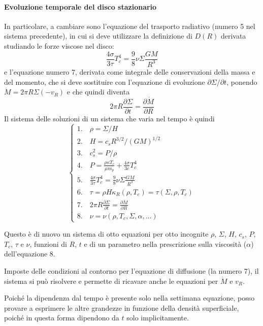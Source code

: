 \documentclass[a4paperbi]{article}
\begin{document}
	\paragraph{Evoluzione temporale del disco stazionario}
	In particolare, a cambiare sono l'equazione del trasporto radiativo (numero 5 nel sistema precedente), in cui si deve utilizzare la definizione di $D(R)$ derivata studiando le forze viscose nel disco:
	\begin{equation}
		\frac{4\sigma}{3\tau}T_c^4=\frac{9}{8}\nu\Sigma\frac{GM}{R^3}
	\end{equation}
	e l'equazione numero 7, derivata come integrale delle conservazioni della massa e del momento, che si deve sostituire con l'equazione di evoluzione $\partial \Sigma/\partial t$, ponendo $\dot{M}=2\pi R\Sigma(-v_R)$ e che quindi diventa
	\begin{equation}
		2\pi R\frac{\partial \Sigma}{\partial t}=\frac{\partial\dot{M}}{\partial R}
	\end{equation}
	Il sistema delle soluzioni di un sistema che varia nel tempo è quindi
	\begin{equation}
	\begin{cases}
		1.\quad \rho=\Sigma/H\\
		2.\quad H=c_sR^{3/2}/(GM)^{1/2}\\
		3.\quad c_s^2=P/\rho\\
		4.\quad P=\frac{\rho\kappa T_c}{\mu m_p}+\frac{4\sigma}{3c}T_c^4\\
		5.\quad \frac{4\sigma}{3\tau}T_c^4=\frac{9}{8}\nu\Sigma\frac{GM}{R^3}\\
		6.\quad \tau=\rho H\kappa_R(\rho,T_c)=\tau(\Sigma,\rho,T_c)\\
		7.\quad 2\pi R\frac{\partial \Sigma}{\partial t}=\frac{\partial\dot{M}}{\partial R}\\
		8.\quad \nu=\nu(\rho,T_c,\Sigma,\alpha,...)		
	\end{cases}
	\end{equation}
	
	Questo è di nuovo un sistema di otto equazioni per otto incognite $\rho$, $\Sigma$, $H$, $c_s$, $P$, $T_c$, $\tau$ e $\nu$, funzioni di $R$, $t$ e di un parametro nella prescrizione sulla viscosità ($\alpha$) dell'equazione 8. 
	
	Imposte delle condizioni al contorno per l'equazione di diffusione (la numero 7), il sistema si può risolvere e permette di ricavare anche le equazioni per $\dot{M}$ e $v_R$.
	
	Poiché la dipendenza dal tempo è presente solo nella settimana equazione, posso provare a esprimere le altre grandezze in funzione della densità superficiale, poiché in questa forma dipendono da $t$ solo implicitamente.
	
\end{document}
